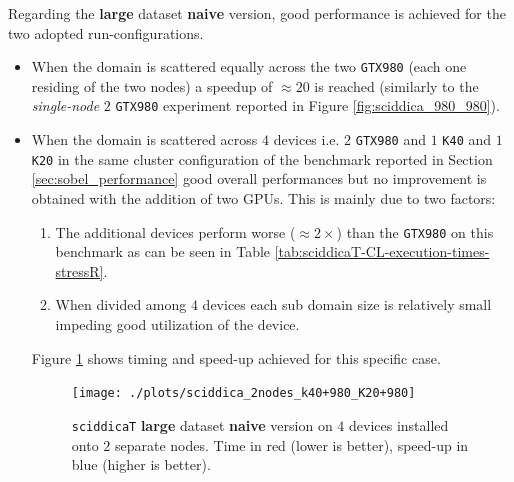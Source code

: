 Regarding the \textbf{large} dataset \textbf{naive} version, good performance is achieved for the two adopted run-configurations.
\begin{itemize}
\item When the domain is scattered equally across the two \texttt{GTX980} (each one residing of the two nodes) a speedup of $\approx 20$ is reached (similarly to the \textit{single-node} $2$ \texttt{GTX980} experiment reported in Figure \ref{fig:sciddica_980_980}).
\item When the domain is scattered across $4$ devices i.e. $2$ \texttt{GTX980} and $1$ \texttt{K40} and $1$ \texttt{K20} in the same cluster configuration of the benchmark reported in Section \ref{sec:sobel_performance} good overall performances but no improvement is obtained with the addition of two GPUs.
This is mainly due to two factors: 
\begin{enumerate}[I]
\item The additional devices perform worse ($\approx 2 \times$) than the \texttt{GTX980} on this benchmark as can be seen in Table \ref{tab:sciddicaT-CL-execution-times-stressR}.
\item When divided among $4$ devices each sub domain size is relatively small impeding good utilization of the device. 
\end{enumerate}
Figure \ref{fig:sciddica_2nodes_k40+980_K20+980} shows timing and speed-up achieved for this specific case. 
\begin{figure}[!htb]
	\centering
	\texttt{[image: ./plots/sciddica\_2nodes\_k40+980\_K20+980]}
	\caption{\texttt{sciddicaT} \textbf{large} dataset \textbf{naive} version on $4$ devices installed onto $2$ separate nodes. Time in red (lower is better), speed-up in blue (higher is better).}
	\label{fig:sciddica_2nodes_k40+980_K20+980}
\end{figure}

\end{itemize}

